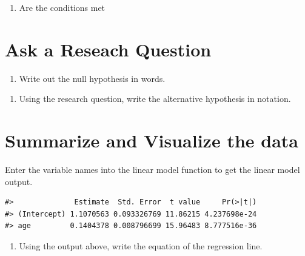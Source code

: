 \documentclass[
]{report}
\providecommand{\tightlist}{%
  \setlength{\itemsep}{0pt}\setlength{\parskip}{0pt}}
\begin{document}
\begin{enumerate}
\def\labelenumi{\arabic{enumi}.}
\setcounter{enumi}{4}
\tightlist
\item
  Are the conditions met
\end{enumerate}

\vspace{1in}

\hypertarget{ask-a-reseach-question}{%
\section{Ask a Reseach Question}\label{ask-a-reseach-question}}

\begin{enumerate}
\def\labelenumi{\arabic{enumi}.}
\setcounter{enumi}{5}
\tightlist
\item
  Write out the null hypothesis in words.
\end{enumerate}

\vspace{1in}

\begin{enumerate}
\def\labelenumi{\arabic{enumi}.}
\setcounter{enumi}{6}
\tightlist
\item
  Using the research question, write the alternative hypothesis in notation.
\end{enumerate}

\vspace{0.5in}

\hypertarget{summarize-and-visualize-the-data}{%
\section{Summarize and Visualize the data}\label{summarize-and-visualize-the-data}}

Enter the variable names into the linear model function to get the linear model output.

\begin{verbatim}
#>              Estimate  Std. Error  t value     Pr(>|t|)
#> (Intercept) 1.1070563 0.093326769 11.86215 4.237698e-24
#> age         0.1404378 0.008796699 15.96483 8.777516e-36
\end{verbatim}

\begin{enumerate}
\def\labelenumi{\arabic{enumi}.}
\setcounter{enumi}{7}
\tightlist
\item
  Using the output above, write the equation of the regression line.
\end{enumerate}
\end{document}

